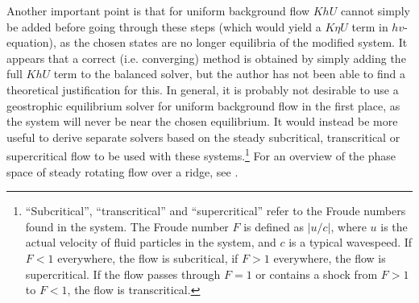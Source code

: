 Another important point is that for uniform background flow $KhU$ cannot simply be added before going through these steps (which would yield a $K\eta U$ term in $hv$-equation), as the chosen states are no longer equilibria of the modified system. It appears that a correct (i.e. converging) method is obtained by simply adding the full $KhU$ term to the balanced solver, but the author has not been able to find a theoretical justification for this. In general, it is probably not desirable to use a geostrophic equilibrium solver for uniform background flow in the first place, as the system will never be near the chosen equilibrium. It would instead be more useful to derive separate solvers based on the steady subcritical, transcritical or supercritical flow to be used with these systems.\footnote{``Subcritical'', ``transcritical'' and ``supercritical'' refer to the Froude numbers found in the system. The Froude number $F$ is defined as $|u/c|$, where $u$ is the actual velocity of fluid particles in the system, and $c$ is a typical wavespeed. If $F < 1$ everywhere, the flow is subcritical, if $F > 1$ everywhere, the flow is supercritical. If the flow passes through $F = 1$ or contains a shock from $F > 1$ to $F < 1$, the flow is transcritical.} For an overview of the phase space of steady rotating flow over a ridge, see \cite{esler2005steady}.